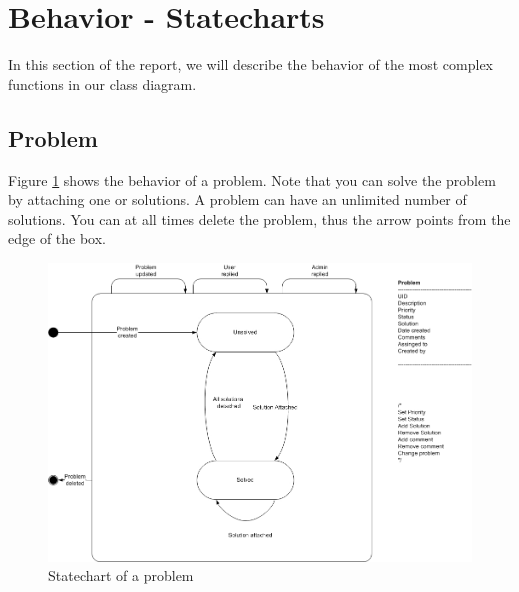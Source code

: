 \section{Behavior - Statecharts}
In this section of the report, we will describe the behavior of the most complex functions in our class diagram.

\subsection{Problem}
Figure \ref{fig:Klasse_diagram_problem} shows the behavior of a problem. Note that you can solve the problem by attaching one or solutions. A problem can have an unlimited number of solutions. You can at all times delete the problem, thus the arrow points from the edge of the box.
\begin{figure}[H]
\begin{center}
\includegraphics[width=1\textwidth]{input/problem_domain_analysis/Klassediagram_problem.jpg}
\caption{Statechart of a problem}
\label{fig:Klasse_diagram_problem}
\end{center}
\end{figure}

